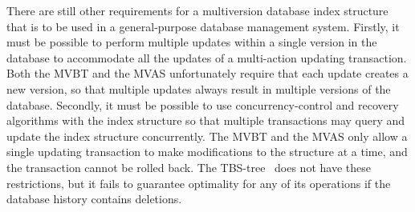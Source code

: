 
There are still other requirements for a multiversion database index
structure that is to be used in a general-purpose database management system.
Firstly, it must be possible to perform multiple updates within a
single version in the database to accommodate all the updates of a
multi-action updating transaction. 
Both the MVBT and the MVAS unfortunately require that each update creates a
new version, so that multiple updates always result in multiple versions of
the database.
Secondly, it must be possible to use concurrency-control and recovery
algorithms with the index structure so that multiple transactions
may query and update the index structure concurrently.
The MVBT and the MVAS only allow a single updating transaction to make
modifications to the structure at a time, and the transaction cannot
be rolled back.
The TBS-tree~\cite{lomet:1989:tsb,lomet:1990:tsb-performance} does
not have these restrictions, but it fails to guarantee optimality for any of
its operations if the database history contains deletions.

